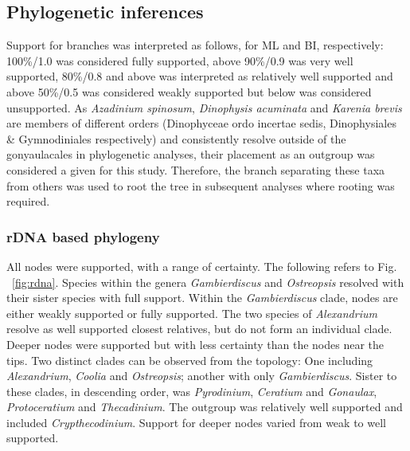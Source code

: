 \documentclass[12pt]{article}
\begin{document}
\subsection{Phylogenetic inferences}
Support for branches was interpreted as follows, for ML and BI, respectively: 100\%/1.0 was considered fully supported, above 90\%/0.9 was very well supported, 80\%/0.8 and above was interpreted as relatively well supported and above 50\%/0.5 was considered weakly supported but below was considered unsupported.
As \emph{Azadinium spinosum}, \emph{Dinophysis acuminata} and \emph{Karenia brevis} are members of different orders (Dinophyceae ordo incertae sedis, Dinophysiales \& Gymnodiniales respectively) and consistently resolve outside of the gonyaulacales in phylogenetic analyses, their placement as an outgroup was considered a given for this study. 
Therefore, the branch separating these taxa from others was used to root the tree in subsequent analyses where rooting was required.
\subsubsection{rDNA based phylogeny}
\FloatBarrier 
All nodes were supported, with a range of certainty.
The following refers to Fig. ~\ref{fig:rdna}.
Species within the genera \emph{Gambierdiscus} and \emph{Ostreopsis} resolved with their sister species with full support. 
Within the \emph{Gambierdiscus} clade, nodes are either weakly supported or fully supported. 
The two species of \emph{Alexandrium} resolve as well supported closest relatives, but do not form an individual clade. 
Deeper nodes were supported but with less certainty than the nodes near the tips. 
Two distinct clades can be observed from the topology: One including \emph{Alexandrium}, \emph{Coolia} and \emph{Ostreopsis}; another with only \emph{Gambierdiscus}. 
Sister to these clades, in descending order, was \emph{Pyrodinium}, \emph{Ceratium} and \emph{Gonaulax}, \emph{Protoceratium} and \emph{Thecadinium}. 
The outgroup was relatively well supported and included \emph{Crypthecodinium}. 
Support for deeper nodes varied from weak to well supported.
\end{document}
